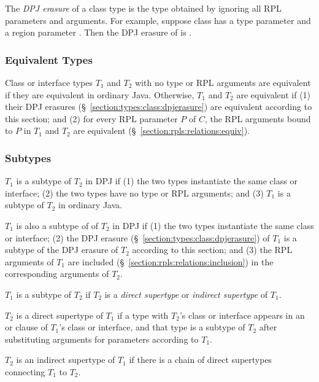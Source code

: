 The \emph{DPJ erasure} of a class type is the type obtained by
ignoring all RPL parameters and arguments.  For example, suppose class
 has a type parameter  and a region parameter .
Then the DPJ erasure of  is .

\subsubsection{Equivalent Types}
\label{section:types:class:equiv}

Class or interface types $T_1$ and $T_2$ with no type or RPL arguments
are equivalent if they are equivalent in ordinary Java.  Otherwise,
$T_1$ and $T_2$ are equivalent if (1) their DPJ erasures
(\S~\ref{section:types:class:dpjerasure}) are equivalent according to
this section; and (2) for every RPL parameter $P$ of $C$, the RPL
arguments bound to $P$ in $T_1$ and $T_2$ are equivalent
(\S~\ref{section:rpls:relations:equiv}).

\subsubsection{Subtypes}
\label{section:types:class:subtypes}

 $T_1$ is
a subtype of $T_2$ in DPJ if (1) the two types instantiate the same
class or interface; (2) the two types have no type or RPL arguments;
and (3) $T_1$ is a subtype of $T_2$ in ordinary Java.

$T_1$ is also a subtype of of $T_2$ in DPJ if (1) the two types
instantiate the same class or interface; (2) the DPJ erasure
(\S~\ref{section:types:class:dpjerasure}) of $T_1$ is a subtype of the
DPJ erasure of $T_2$ according to this section; and (3) the RPL
arguments of $T_1$ are included
(\S~\ref{section:rpls:relations:inclusion}) in the corresponding
arguments of $T_2$.

 $T_1$ is a subtype
of $T_2$ if $T_2$ is a \emph{direct supertype} or \emph{indirect
  supertype} of $T_1$.

 $T_2$ is a direct supertype of $T_1$ if a
type with $T_2$'s class or interface appears in an  or
 clause of $T_1$'s class or interface, and that type
is a subtype of $T_2$ after substituting arguments for parameters
according to $T_1$.

 $T_2$ is an indirect supertype of $T_1$
if there is a chain of direct supertypes connecting $T_1$ to $T_2$.

